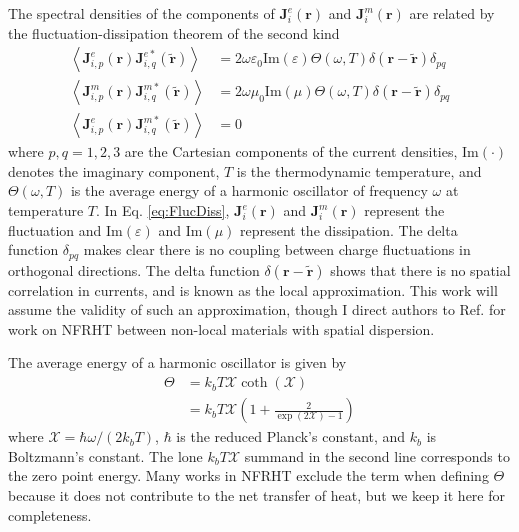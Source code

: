 The spectral densities of the components of $\boldsymbol{J}_{i}^{e}(\boldsymbol{r})$ and $\boldsymbol{J}_{i}^{m}(\boldsymbol{r})$ are related by the fluctuation-dissipation theorem of the second kind \cite{Eckhardt1982} 
%
\begin{subequations} \label{eq:FlucDiss}
\begin{align}
\left< \boldsymbol{J}_{i,p}^{e}(\boldsymbol{r}) \boldsymbol{J}_{i,q}^{e*}(\widetilde{\boldsymbol{r}}) \right> &= 2 \omega \varepsilon_{0} \mathrm{Im}{\left( \varepsilon \right)} \Theta(\omega,T) \delta \! \left( \boldsymbol{r} - \boldsymbol{\widetilde{r}} \right) \delta_{pq}
\\
\left< \boldsymbol{J}_{i,p}^{m}(\boldsymbol{r}) \boldsymbol{J}_{i,q}^{m*}(\widetilde{\boldsymbol{r}}) \right> &= 2 \omega \mu_{0} \mathrm{Im}{\left( \mu \right)} \Theta(\omega,T) \delta \! \left( \boldsymbol{r} - \boldsymbol{\widetilde{r}} \right) \delta_{pq}
\\
\left< \boldsymbol{J}_{i,p}^{e}(\boldsymbol{r}) \boldsymbol{J}_{i,q}^{m*}(\widetilde{\boldsymbol{r}}) \right> &= 0
\end{align}
\end{subequations}
%
where $p,q=1,2,3$ are the Cartesian components of the current densities, $\mathrm{Im}{\left(\cdot\right)}$ denotes the imaginary component, $T$ is the thermodynamic temperature, and $\Theta(\omega, T)$ is the average energy of a harmonic oscillator of frequency $\omega$ at temperature $T$. In Eq. \ref{eq:FlucDiss}, $\boldsymbol{J}_{i}^{e}(\boldsymbol{r})$ and $\boldsymbol{J}_{i}^{m}(\boldsymbol{r})$ represent the fluctuation and $\mathrm{Im}{\left( \varepsilon \right)}$ and $\mathrm{Im}{\left( \mu \right)}$ represent the dissipation. The delta function $\delta_{pq}$ makes clear there is no coupling between charge fluctuations in orthogonal directions. The delta function $\delta(\boldsymbol{r} - \widetilde{\boldsymbol{r}})$ shows that there is no spatial correlation in currents, and is known as the local approximation. This work will assume the validity of such an approximation, though I direct authors to Ref.  for work on NFRHT between non-local materials with spatial dispersion.

The average energy of a harmonic oscillator is given by
%
\begin{equation}
\begin{split}
\Theta &= k_{b} T \mathcal{X} \coth{\left( \mathcal{X} \right)}
\\
&= k_{b} T \mathcal{X} \left( 1 + \frac{2}{\exp{\left( 2 \mathcal{X} \right)} - 1} \right) 
\end{split}
\end{equation}
%
where $\mathcal{X} = \hbar\omega/(2 k_{b} T)$, $\hbar$ is the reduced Planck's constant, and $k_{b}$ is Boltzmann's constant. The lone $k_{b} T \mathcal{X}$ summand in the second line corresponds to the zero point energy. Many works in NFRHT exclude the term when defining $\Theta$ because it does not contribute to the net transfer of heat, but we keep it here for completeness.


